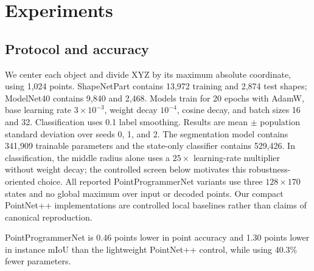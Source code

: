 \documentclass[times,twocolumn,final,authoryear]{elsarticle}
\begin{document}
\section{Experiments}
\subsection{Protocol and accuracy}
We center each object and divide XYZ by its maximum absolute coordinate, using 1,024 points. ShapeNetPart contains 13,972 training and 2,874 test shapes; ModelNet40 contains 9,840 and 2,468. Models train for 20 epochs with AdamW, base learning rate $3\times10^{-3}$, weight decay $10^{-4}$, cosine decay, and batch sizes 16 and 32. Classification uses 0.1 label smoothing. Results are mean $\pm$ population standard deviation over seeds 0, 1, and 2. The segmentation model contains 341,909 trainable parameters and the state-only classifier contains 529,426. In classification, the middle radius alone uses a $25\times$ learning-rate multiplier without weight decay; the controlled screen below motivates this robustness-oriented choice. All reported PointProgrammerNet variants use three $128\times170$ states and no global maximum over input or decoded points. Our compact PointNet++ implementations are controlled local baselines rather than claims of canonical reproduction.

\begin{table}[t]
\centering
\caption{ShapeNetPart segmentation with XYZ input. PointProgrammerNet never pools over decoded query points.}
\label{tab:segmentation_accuracy}
\end{table}
PointProgrammerNet is 0.46 points lower in point accuracy and 1.30 points lower in instance mIoU than the lightweight PointNet++ control, while using 40.3\% fewer parameters.
\end{document}
